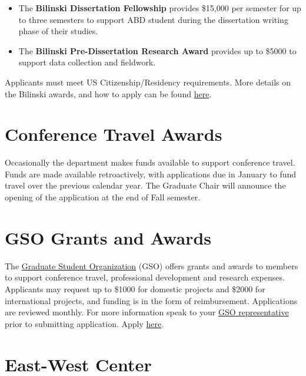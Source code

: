 \documentclass[
]{book}
\begin{document}
\begin{itemize}
\item
  The \textbf{Bilinski Dissertation Fellowship} provides \$15,000 per semester for up to three semesters to support ABD student during the dissertation writing phase of their studies.
\item
  The \textbf{Bilinski Pre-Dissertation Research Award} provides up to \$5000 to support data collection and fieldwork.
\end{itemize}

Applicants must meet US Citizenship/Residency requirements. More details on the Bilinski awards, and how to apply can be found \href{http://ling.hawaii.edu/degree-programs/funding/bilinski/}{here}.

\hypertarget{conference-travel-awards}{%
\section{Conference Travel Awards}\label{conference-travel-awards}}

Occasionally the department makes funds available to support conference travel. Funds are made available retroactively, with applications due in January to fund travel over the previous calendar year. The Graduate Chair will announce the opening of the application at the end of Fall semester.

\hypertarget{gso-grants-and-awards}{%
\section{GSO Grants and Awards}\label{gso-grants-and-awards}}

The \href{https://uhmgso.wixsite.com/website-1/grants-and-awards}{Graduate Student Organization} (GSO) offers grants and awards to members to support conference travel, professional development and research expenses. Applicants may request up to \$1000 for domestic projects and \$2000 for international projects, and funding is in the form of reimbursement. Applications are reviewed monthly. For more information speak to your \href{http://ling.hawaii.edu/activities/lsm/}{GSO representative} prior to submitting application. Apply \href{https://form.jotform.com/gsogrant/gso-ga-application-title-page}{here}.

\hypertarget{east-west-center}{%
\section{East-West Center}\label{east-west-center}}
\end{document}
